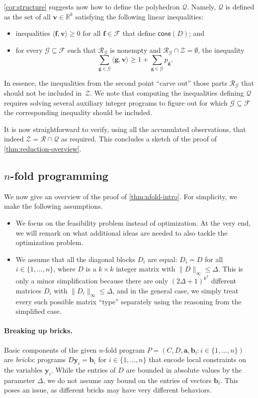 \documentclass{article}
\renewcommand{\leq}{\leqslant}
\renewcommand{\geq}{\geqslant}
\newcommand{\R}{\mathbb{R}}
\newcommand{\tup}[1]{{\mathbf{#1}}}
\newcommand{\yy}{\tup y}
\newcommand{\av}{\tup a}
\newcommand{\bb}{\tup b}
\newcommand{\ff}{\tup f}
\renewcommand{\gg}{\tup g}
\newcommand{\myvv}{\tup v} %
\newcommand{\Qq}{\mathcal{Q}}
\newcommand{\Ff}{\mathcal{F}}
\newcommand{\Gg}{\mathcal{G}}
\newcommand{\Rr}{\mathcal{R}}
\newcommand{\Zz}{\mathcal{Z}}
\newcommand{\sca}[2]{\langle #1,#2\rangle}
\newcommand{\nfold}{$n$-fold}
\newcommand{\realcone}{\mathsf{cone}}
\begin{document}
\cref{cor:structure} suggests now how to define the polyhedron $\Qq$. Namely, $\Qq$ is defined as the set of all $\myvv\in \R^k$ satisfying the following linear inequalities:
\begin{itemize}[nosep]
\item inequalities $\sca{\ff}{\myvv}\geq 0$ for all $\ff\in \Ff$ that define $\realcone(D)$; and
\item for every $\Gg\subseteq \Ff$ such that $\Rr_\Gg$ is nonempty and $\Rr_\Gg\cap \Zz=\emptyset$, the inequality
$$\sum_{\gg\in \Gg} \sca{\gg}{\myvv}\geq 1+\sum_{\gg\in \Gg} p_{\gg}.$$
\end{itemize}
In essence, the inequalities from the second point ``carve out'' those parts $\Rr_\Gg$ that should not be included in~$\Zz$. We note that computing the inequalities defining $\Qq$ requires solving several auxiliary integer programs to figure out for which $\Gg\subseteq \Ff$ the corresponding inequality should be included.

It is now straightforward to verify, using all the accumulated observations, that indeed $\Zz=\Rr\cap \Qq$ as required. This concludes a sketch of the proof of \cref{thm:reduction-overview}.

\subsection{\texorpdfstring{\nfold{}}{n-fold} programming}

We now give an overview of the proof of \cref{thm:nfold-intro}. For simplicity, we make the following assumptions.
\begin{itemize}[nosep]
\item We focus on the feasibility problem instead of optimization. At the very end, we will remark on what additional ideas are needed to also tackle the optimization problem.
\item We assume that all the diagonal blocks $D_i$ are equal: $D_i=D$ for all $i\in \{1,\ldots,n\}$, where $D$ is a $k\times k$ integer matrix with $\|D\|_\infty\leq \Delta$. This is only a minor simplification because there are only $(2\Delta+1)^{k^2}$ different matrices $D_i$ with $\|D_i\|_\infty\leq \Delta$, and in the general case, we simply treat every such possible matrix ``type'' separately using the reasoning from the simplified case.
\end{itemize}

\paragraph*{Breaking up bricks.} Basic components of the given $n$-fold program $P=(C,D,\av,\bb_i\colon i\in \{1,\ldots,n\})$ are {\em{bricks}}: programs $D\yy_i=\bb_i$ for $i\in \{1,\ldots,n\}$ that encode local constraints on the variables $\yy_i$. While the entries of $D$ are bounded in absolute values by the parameter $\Delta$, we do not assume any bound on the entries of vectors $\bb_i$. This poses an issue, as different bricks may have very different behaviors.
\end{document}
